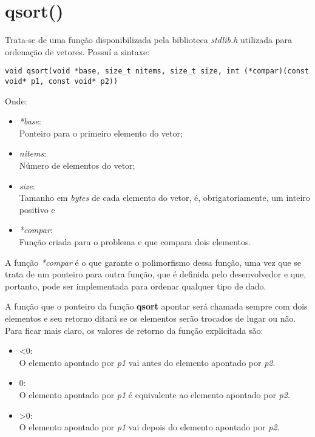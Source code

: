 \section{\normalsize qsort()}
	Trata-se de uma função disponibilizada pela biblioteca \textit{stdlib.h} utilizada para ordenação de vetores. Possuí a sintaxe:
	\begin{lstlisting}[style=C]
void qsort(void *base, size_t nitems, size_t size, int (*compar)(const void* p1, const void* p2))
	\end{lstlisting}
	
	Onde:
	\begin{itemize}
		\item \textit{*base}:\\Ponteiro para o primeiro elemento do vetor;
		\item \textit{nitems}:\\Número de elementos do vetor;
		\item \textit{size}:\\Tamanho em \textit{bytes} de cada elemento do vetor, é, obrigatoriamente, um inteiro positivo e
		\item \textit{*compar}:\\Função criada para o problema e que compara dois elementos.
	\end{itemize}
	
	A função \textit{*compar} é o que garante o polimorfismo dessa função, uma vez que se trata de um ponteiro para outra função, que é definida pelo desenvolvedor e que, portanto, pode ser implementada para ordenar qualquer tipo de dado.
	
	A função que o ponteiro da função \textbf{qsort} apontar será chamada sempre com dois elementos e seu retorno ditará se os elementos serão trocados de lugar ou não. Para ficar mais claro, os valores de retorno da função explicitada são:
	\begin{itemize}
		\item <0:\\O elemento apontado por \textit{p1} vai antes do elemento apontado por \textit{p2}.
		\item 0:\\O elemento apontado por \textit{p1} é equivalente ao elemento apontado por \textit{p2}.
		\item >0:\\O elemento apontado por \textit{p1} vai depois do elemento apontado por \textit{p2}.
	\end{itemize}